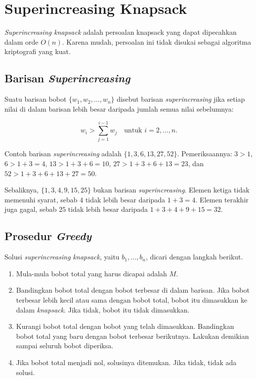 \section{Superincreasing Knapsack}
\label{sec:superincreasing}

\textit{Superincreasing knapsack} adalah persoalan knapsack yang dapat
dipecahkan dalam orde $O(n)$. Karena mudah, persoalan ini tidak disukai sebagai
algoritma kriptografi yang kuat.

\subsection{Barisan \textit{Superincreasing}}

Suatu barisan bobot $\{w_1, w_2, \dots, w_n\}$ disebut barisan
\textit{superincreasing} jika setiap nilai di dalam barisan lebih besar daripada
jumlah semua nilai sebelumnya:

\begin{equation}
w_i > \sum_{j=1}^{i-1} w_j \quad \text{untuk } i = 2, \dots, n .
\label{eq:superincreasing}
\end{equation}

Contoh barisan \textit{superincreasing} adalah $\{1, 3, 6, 13, 27, 52\}$.
Pemeriksaannya: $3 > 1$, $6 > 1 + 3 = 4$, $13 > 1 + 3 + 6 = 10$,
$27 > 1 + 3 + 6 + 13 = 23$, dan $52 > 1 + 3 + 6 + 13 + 27 = 50$.

Sebaliknya, $\{1, 3, 4, 9, 15, 25\}$ bukan barisan \textit{superincreasing}.
Elemen ketiga tidak memenuhi syarat, sebab $4$ tidak lebih besar daripada
$1 + 3 = 4$. Elemen terakhir juga gagal, sebab $25$ tidak lebih besar daripada
$1 + 3 + 4 + 9 + 15 = 32$.

\subsection{Prosedur \textit{Greedy}}

Solusi \textit{superincreasing knapsack}, yaitu $b_1, \dots, b_n$, dicari dengan
langkah berikut.

\begin{enumerate}
    \item Mula-mula bobot total yang harus dicapai adalah $M$.
    \item Bandingkan bobot total dengan bobot terbesar di dalam barisan. Jika
          bobot terbesar lebih kecil atau sama dengan bobot total, bobot itu
          dimasukkan ke dalam \textit{knapsack}. Jika tidak, bobot itu tidak
          dimasukkan.
    \item Kurangi bobot total dengan bobot yang telah dimasukkan. Bandingkan
          bobot total yang baru dengan bobot terbesar berikutnya. Lakukan
          demikian sampai seluruh bobot diperiksa.
    \item Jika bobot total menjadi nol, solusinya ditemukan. Jika tidak, tidak
          ada solusi.
\end{enumerate}

